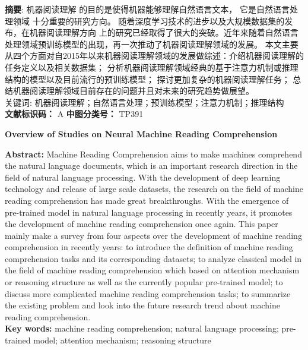 \noindent \textbf{摘\quad 要}: 机器阅读理解
的目的是使得机器能够理解自然语言文本，
它是自然语言处理领域
十分重要的研究方向。
随着深度学习技术的进步以及大规模数据集的发布，在机器阅读理解方向
上的研究已经取得了很大的突破。近年来随着自然语言处理领域预训练模型的出现，再一次推动了机器阅读理解领域的发展。
本文主要从四个方面对自2015年以来机器阅读理解领域的发展做综述：介绍机器阅读理解的任务定义以及相关数据集；
分析机器阅读理解领域经典的基于注意力机制或推理结构的模型以及目前流行的预训练模型；
探讨更加复杂的机器阅读理解任务；
总结机器阅读理解领域目前存在的问题并且对未来的研究趋势做展望。\\
\heiti 关键词: \songti 机器阅读理解；自然语言处理；预训练模型；注意力机制；推理结构　\\
\textbf{文献标识码：} A  \qquad \textbf{中图分类号：} TP391
\begin{center}
    \textbf{ Overview of Studies on Neural Machine Reading Comprehension \\}


\end{center}
\textbf{Abstract:} Machine Reading Comprehension aims to make machines comprehend the natural language documents, which 
is an important research direction
 in the field of natural language processing. With the development of deep learning technology and release of large scale datasets, the research on the field of machine reading comprehension has made great breakthroughs. 
 With the emergence of pre-trained model in natural language processing in recently years, it promotes the development of machine reading comprehension once again. This paper mainly make a survey from four aspects over the development of machine reading comprehension in recently years: to introduce the definition of 
  machine reading comprehension tasks and its corresponding datasets; to analyze classical model in the field of machine reading comprehension  
  which based on attention mechanism or reasoning structure as well as the currently 
  popular pre-trained model; to discuss more complicated machine reading comprehension tasks;
   to summarize the existing problem and look into the future research trend about machine reading comprehension. \\
\textbf{Key words:} machine reading comprehension; natural language processing; pre-trained model; attention mechanism; reasoning structure











